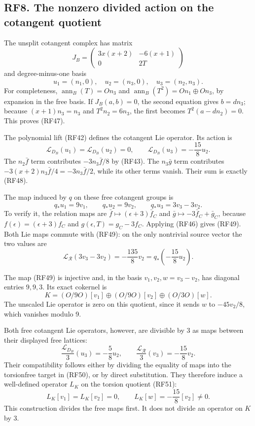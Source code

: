 \documentclass[
  10pt,
]{article}
\begin{document}
\subsection{RF8. The nonzero divided action on the cotangent
quotient}\label{rf8.-the-nonzero-divided-action-on-the-cotangent-quotient}

The unsplit cotangent complex has matrix \[
J_B=
\begin{pmatrix}3x(x+2)&-6(x+1)\\0&2T\end{pmatrix}
\] and degree-minus-one basis \[
u_1=(n_1,0),\quad u_2=(n_3,0),\quad u_3=(n_2,n_3).
\tag{RF47}
\] For completeness, \(\operatorname{ann}_B(T)=On_3\) and
\(\operatorname{ann}_B(T^2)=On_1\oplus On_3\), by expansion in the free
basis. If \(J_B(a,b)=0\), the second equation gives \(b=dn_3\); because
\((x+1)n_3=n_3\) and \(T^2n_2=6n_3\), the first becomes
\(T^2(a-dn_2)=0\). This proves (RF47).

The polynomial lift (RF42) defines the cotangent Lie operator. Its
action is \[
\mathcal L_{D_B}(u_1)=\mathcal L_{D_B}(u_2)=0,\qquad
\mathcal L_{D_B}(u_3)=-\frac{15}{8}u_2.
\tag{RF48}
\] The \(n_2\bar f\) term contributes \(-3n_3\bar f/8\) by (RF43). The
\(n_3\bar g\) term contributes \(-3(x+2)n_3\bar f/4=-3n_3\bar f/2\),
while its other terms vanish. Their sum is exactly (RF48).

The map induced by \(q\) on these free cotangent groups is \[
q_*u_1=9v_1,\qquad q_*u_2=9v_2,\qquad
q_*u_3=3v_3-3v_2.
\tag{RF49}
\] To verify it, the relation maps are
\(\bar f\mapsto(\epsilon+3)\bar f_C\) and
\(\bar g\mapsto-3\bar f_C+\bar g_C\), because
\(f(\epsilon)=(\epsilon+3)f_C\) and \(g(\epsilon,T)=g_C-3f_C\). Applying
(RF46) gives (RF49). Both Lie maps commute with (RF49): on the only
nontrivial source vector the two values are \[
\mathcal L_{\mathcal R}(3v_3-3v_2)
=-\frac{135}{8}v_2
=q_*\!\left(-\frac{15}{8}u_2\right).
\tag{RF50}
\]

The map (RF49) is injective and, in the basis \(v_1,v_2,w=v_3-v_2\), has
diagonal entries \(9,9,3\). Its exact cokernel is \[
K=(O/9O)[v_1]\oplus(O/9O)[v_2]\oplus(O/3O)[w].
\tag{RF51}
\] The unscaled Lie operator is zero on this quotient, since it sends
\(w\) to \(-45v_2/8\), which vanishes modulo 9.

Both free cotangent Lie operators, however, are divisible by 3 as maps
between their displayed free lattices: \[
\frac{\mathcal L_{D_B}}3(u_3)=-\frac58u_2,\qquad
\frac{\mathcal L_{\mathcal R}}3(v_3)=-\frac{15}{8}v_2.
\tag{RF52}
\] Their compatibility follows either by dividing the equality of maps
into the torsionfree target in (RF50), or by direct substitution. They
therefore induce a well-defined operator \(L_K\) on the torsion quotient
(RF51): \[
L_K[v_1]=L_K[v_2]=0,\qquad
L_K[w]=-\frac{15}{8}[v_2]\ne0.
\tag{RF53}
\] This construction divides the free maps first. It does not divide an
operator on \(K\) by 3.
\end{document}
